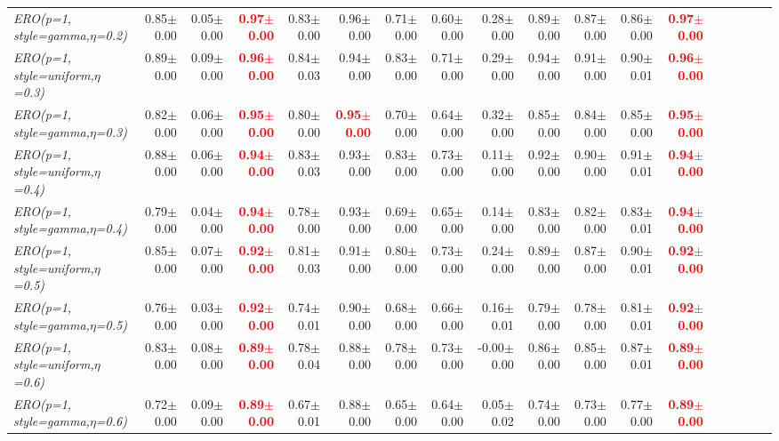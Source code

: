 \documentclass[nohyperref]{article}
\theoremstyle{plain}
\theoremstyle{definition}
\theoremstyle{remark}
\newcommand{\red}[1]{\textcolor{red}{\textbf{#1}}}
\begin{document}
\begin{table*}[!ht]
{\begin{tabular}{lrrrrrrrrrrrrrrrrr}
			{\it ERO(p=1, style=gamma,$\eta$=0.2)} & 0.85$\pm$0.00 & 0.05$\pm$0.00 & \red{0.97$\pm$0.00} & 0.83$\pm$0.00 & 0.96$\pm$0.00 & 0.71$\pm$0.00 & 0.60$\pm$0.00 & 0.28$\pm$0.00 & 0.89$\pm$0.00 & 0.87$\pm$0.00 & 0.86$\pm$0.00 & \red{0.97$\pm$0.00} \\
			{\it ERO(p=1, style=uniform,$\eta$=0.3)} & 0.89$\pm$0.00 & 0.09$\pm$0.00 & \red{0.96$\pm$0.00} & 0.84$\pm$0.03 & 0.94$\pm$0.00 & 0.83$\pm$0.00 & 0.71$\pm$0.00 & 0.29$\pm$0.00 & 0.94$\pm$0.00 & 0.91$\pm$0.00 & 0.90$\pm$0.01 & \red{0.96$\pm$0.00} \\
			{\it ERO(p=1, style=gamma,$\eta$=0.3)} & 0.82$\pm$0.00 & 0.06$\pm$0.00 & \red{0.95$\pm$0.00} & 0.80$\pm$0.00 & \red{0.95$\pm$0.00} & 0.70$\pm$0.00 & 0.64$\pm$0.00 & 0.32$\pm$0.00 & 0.85$\pm$0.00 & 0.84$\pm$0.00 & 0.85$\pm$0.00 & \red{0.95$\pm$0.00} \\
			{\it ERO(p=1, style=uniform,$\eta$=0.4)} & 0.88$\pm$0.00 & 0.06$\pm$0.00 & \red{0.94$\pm$0.00} & 0.83$\pm$0.03 & 0.93$\pm$0.00 & 0.83$\pm$0.00 & 0.73$\pm$0.00 & 0.11$\pm$0.00 & 0.92$\pm$0.00 & 0.90$\pm$0.00 & 0.91$\pm$0.01 & \red{0.94$\pm$0.00} \\
			{\it ERO(p=1, style=gamma,$\eta$=0.4)} & 0.79$\pm$0.00 & 0.04$\pm$0.00 & \red{0.94$\pm$0.00} & 0.78$\pm$0.00 & 0.93$\pm$0.00 & 0.69$\pm$0.00 & 0.65$\pm$0.00 & 0.14$\pm$0.00 & 0.83$\pm$0.00 & 0.82$\pm$0.00 & 0.83$\pm$0.01 & \red{0.94$\pm$0.00} \\
			{\it ERO(p=1, style=uniform,$\eta$=0.5)} & 0.85$\pm$0.00 & 0.07$\pm$0.00 & \red{0.92$\pm$0.00} & 0.81$\pm$0.03 & 0.91$\pm$0.00 & 0.80$\pm$0.00 & 0.73$\pm$0.00 & 0.24$\pm$0.00 & 0.89$\pm$0.00 & 0.87$\pm$0.00 & 0.90$\pm$0.01 & \red{0.92$\pm$0.00} \\
			{\it ERO(p=1, style=gamma,$\eta$=0.5)} & 0.76$\pm$0.00 & 0.03$\pm$0.00 & \red{0.92$\pm$0.00} & 0.74$\pm$0.01 & 0.90$\pm$0.00 & 0.68$\pm$0.00 & 0.66$\pm$0.00 & 0.16$\pm$0.01 & 0.79$\pm$0.00 & 0.78$\pm$0.00 & 0.81$\pm$0.01 & \red{0.92$\pm$0.00} \\
			{\it ERO(p=1, style=uniform,$\eta$=0.6)} & 0.83$\pm$0.00 & 0.08$\pm$0.00 & \red{0.89$\pm$0.00} & 0.78$\pm$0.04 & 0.88$\pm$0.00 & 0.78$\pm$0.00 & 0.73$\pm$0.00 & -0.00$\pm$0.00 & 0.86$\pm$0.00 & 0.85$\pm$0.00 & 0.87$\pm$0.01 & \red{0.89$\pm$0.00} \\
			{\it ERO(p=1, style=gamma,$\eta$=0.6)} & 0.72$\pm$0.00 & 0.09$\pm$0.00 & \red{0.89$\pm$0.00} & 0.67$\pm$0.01 & 0.88$\pm$0.00 & 0.65$\pm$0.00 & 0.64$\pm$0.00 & 0.05$\pm$0.02 & 0.74$\pm$0.00 & 0.73$\pm$0.00 & 0.77$\pm$0.00 & \red{0.89$\pm$0.00} \\

\end{tabular}}
\end{table*}
\end{document}
